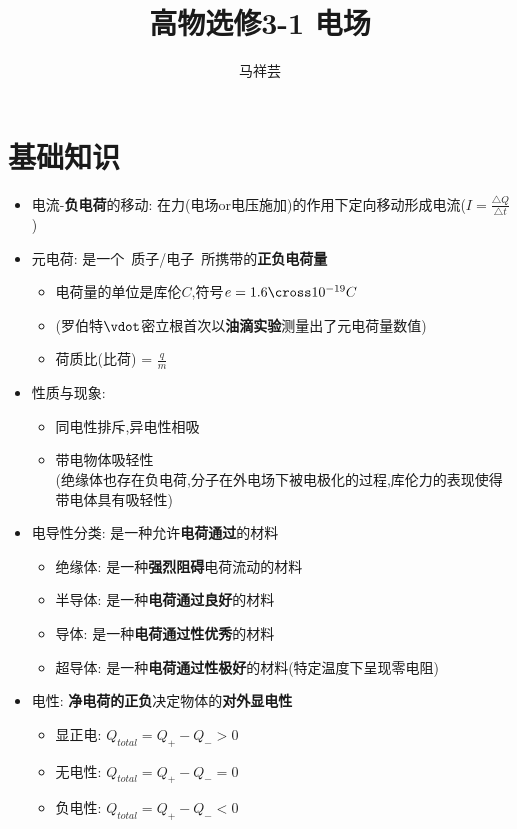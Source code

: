\documentclass{article}
\title{高物选修3-1 \quad 电场}
\author{马祥芸}
\begin{document}
    \maketitle
    \tableofcontents
    \newpage

    \section{基础知识}  
    \begin{itemize}
        \item 电流-\textbf{负电荷}的移动: 在力(电场or电压施加)的作用下定向移动形成电流($I = \frac{\triangle Q}{\triangle t}$)
        \item 元电荷: 是一个\, 质子/电子\, 所携带的\textbf{正负电荷量}
            \begin{itemize}[label={}]
                \item 电荷量的单位是库伦$C$,符号$e = 1.6 \cross 10^{-19} C$ 
                \item (罗伯特$\vdot$密立根首次以\textbf{油滴实验}测量出了元电荷量数值)
                \item 荷质比(比荷) = $\frac{q}{m}$
            \end{itemize}
        
        \item 性质与现象:
        \begin{itemize}
            \item 同电性排斥,异电性相吸
            \item 带电物体吸轻性    \\
            (绝缘体也存在负电荷,分子在外电场下被电极化的过程,库伦力的表现使得带电体具有吸轻性)
            
        \end{itemize}
        \item 电导性分类: 是一种允许\textbf{电荷通过}的材料
        
        \begin{itemize}
            \item 绝缘体: 是一种\textbf{强烈阻碍}电荷流动的材料
            \item 半导体: 是一种\textbf{电荷通过良好}的材料
            \item 导体: 是一种\textbf{电荷通过性优秀}的材料
            \item 超导体: 是一种\textbf{电荷通过性极好}的材料(特定温度下呈现零电阻)
        \end{itemize} 
        
        \item 电性: \textbf{净电荷的正负}决定物体的\textbf{对外显电性}
        
        \begin{itemize}
            \item 显正电: \quad $Q_{total} = Q_{+} - Q_{-} > 0 $
            \item 无电性: \quad $Q_{total} = Q_{+} - Q_{-} = 0 $
            \item 负电性: \quad $Q_{total} = Q_{+} - Q_{-} < 0 $
        \end{itemize}

    \end{itemize}
\end{document}
